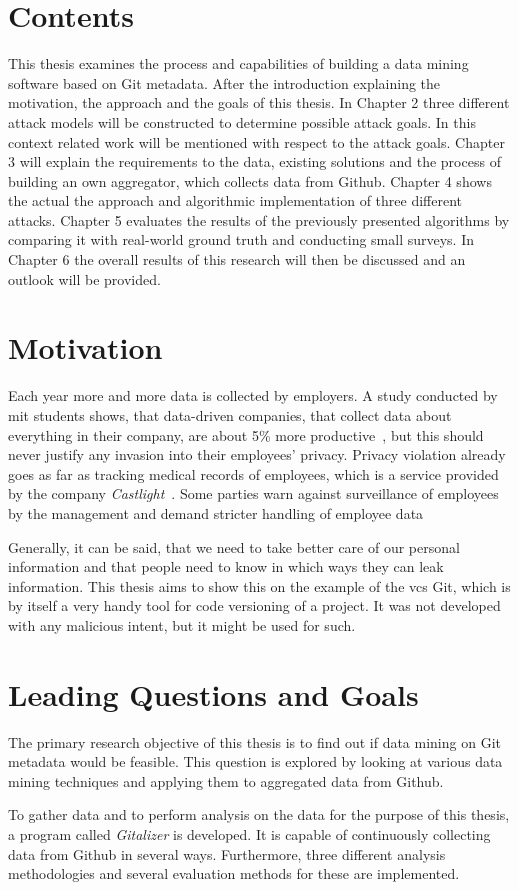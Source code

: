 \section{Contents}
This thesis examines the process and capabilities of building a data mining software based on Git metadata.
After the introduction explaining the motivation, the approach and the goals of this thesis.
In Chapter 2 three different attack models will be constructed to determine possible attack goals.
In this context related work will be mentioned with respect to the attack goals.
Chapter 3 will explain the requirements to the data, existing solutions and the process of building an own aggregator, which collects data from Github.
Chapter 4 shows the actual the approach and algorithmic implementation of three different attacks.
Chapter 5 evaluates the results of the previously presented algorithms by comparing it with real-world ground truth and conducting small surveys.
In Chapter 6 the overall results of this research will then be discussed and an outlook will be provided.

\section{Motivation}
Each year more and more data is collected by employers.
A study conducted by \ac{mit} students shows, that data-driven companies, that collect data about everything in their company, are about 5\% more productive~\cite{article:management-revolution}, but this should never justify any invasion into their employees' privacy.
Privacy violation already goes as far as tracking medical records of employees, which is a service provided by the company \emph{Castlight}~\cite{article:medical-data}.
Some parties warn against surveillance of employees by the management and demand stricter handling of employee data~\cite{article:vermessung-belegschaft}

Generally, it can be said, that we need to take better care of our personal information and that people need to know in which ways they can leak information.
This thesis aims to show this on the example of the \ac{vcs} Git, which is by itself a very handy tool for code versioning of a project.
It was not developed with any malicious intent, but it might be used for such.

\section{Leading Questions and Goals}

The primary research objective of this thesis is to find out if data mining on Git metadata would be feasible.
This question is explored by looking at various data mining techniques and applying them to aggregated data from Github.

To gather data and to perform analysis on the data for the purpose of this thesis, a program called \emph{Gitalizer} is developed.
It is capable of continuously collecting data from Github in several ways.
Furthermore, three different analysis methodologies and several evaluation methods for these are implemented.
